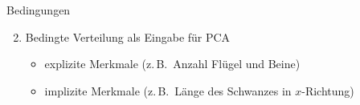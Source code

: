 \documentclass{beamer}
\newcommand{\zb}{z.\,B.\ }
\begin{document}
\begin{frame}{Bedingungen}
 \begin{enumerate}
   \setcounter{enumi}{1}
   \item Bedingte Verteilung als Eingabe für PCA
   \begin{itemize}
    \item explizite Merkmale (\zb Anzahl Flügel und Beine)
    \item implizite Merkmale (\zb Länge des Schwanzes in $x$-Richtung)
   \end{itemize}
  \end{enumerate}
  \begin{figure}
   ~
   ~
  \end{figure}
\end{frame}
\end{document}
